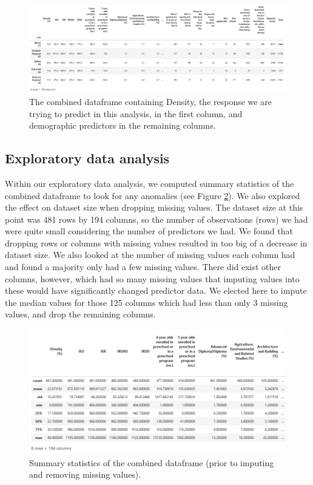 \documentclass[a4paper]{article}
\begin{document}
\begin{figure}
\centering
  \includegraphics[width=\linewidth]{fig7.png}
  \caption{The combined dataframe containing Density, the response we are trying to predict in this analysis, in the first column, and demographic predictors in the remaining columns.}
  \label{fig:fig7}
\end{figure}

\subsection{Exploratory data analysis}

Within our exploratory data analysis, we computed summary statistics of the combined dataframe to look for any anomalies (see Figure \ref{fig:fig8}). We also explored the effect on dataset size when dropping missing values. The dataset size at this point was 481 rows by 194 columns, so the number of observations (rows) we had were quite small considering the number of predictors we had. We found that dropping rows or columns with missing values resulted in too big of a decrease in dataset size. We also looked at the number of missing values each column had and found a majority only had a few missing values. There did exist other columns, however, which had so many missing values that imputing values into these would have significantly changed predictor data. We elected here to impute the median values for those 125 columns which had less than only 3 missing values, and drop the remaining columns. 

\begin{figure}
\centering
  \includegraphics[width=\linewidth]{fig8.png}
  \caption{Summary statistics of the combined dataframe (prior to imputing and removing missing values).}
  \label{fig:fig8}
\end{figure}
\end{document}
